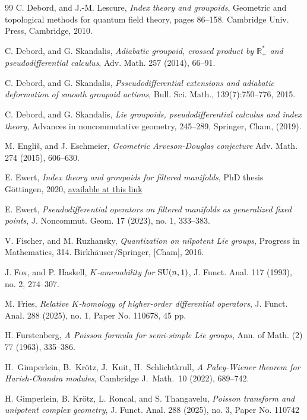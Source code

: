 \documentclass[a4paper,reqno]{amsart}
\numberwithin{equation}{section}
\theoremstyle{definition}
\theoremstyle{remark}
\begin{document}
\begin{thebibliography}{99}
 C. Debord, and J.-M. Lescure, \emph{Index theory and groupoids},  Geometric  and topological methods for quantum field theory, pages 86--158. Cambridge Univ. Press, Cambridge, 2010.

 C. Debord, and G. Skandalis, \emph{Adiabatic groupoid, crossed product by $\mathbb{R}_+^\ast$ and pseudodifferential calculus}, Adv. Math. 257 (2014), 66--91. 

 C. Debord, and G. Skandalis, \emph{Psseudodifferential extensions and adiabatic deformation of smooth groupoid actions}, Bull. Sci. Math., 139(7):750--776, 2015.

 C. Debord, and G. Skandalis, \emph{Lie groupoids, pseudodifferential calculus and index theory}, Advances in noncommutative geometry, 245--289, Springer, Cham, (2019).

 M. Engliš, and J. Eschmeier, \emph{Geometric Arveson-Douglas conjecture} Adv. Math. 274 (2015), 606--630.

 E. Ewert, \emph{Index theory and groupoids for filtered manifolds}, PhD thesis Göttingen, 2020, \href{https://ediss.uni-goettingen.de/handle/21.11130/00-1735-0000-0005-152D-2}{available at this link}

 E. Ewert, \emph{Pseudodifferential operators on filtered manifolds as generalized fixed points}, J. Noncommut. Geom. 17 (2023), no. 1, 333--383.


 V. Fischer, and M. Ruzhansky, \emph{Quantization on nilpotent Lie groups}, Progress in Mathematics, 314. Birkhäuser/Springer, [Cham], 2016. 



 J. Fox, and P. Haskell, \emph{$K$-amenability for ${\rm SU}(n,1)$}, J. Funct. Anal. 117 (1993), no. 2, 274--307.

 M. Fries, \emph{Relative $K$-homology of higher-order differential operators}, J. Funct. Anal. 288 (2025), no. 1, Paper No. 110678, 45 pp.

 H. Furstenberg, \emph{A Poisson formula for semi-simple Lie groups}, Ann. of Math. (2) 77 (1963), 335--386.

 H.~Gimperlein, B.~Kr\"{o}tz, J.~Kuit, H.~Schlichtkrull, \emph{A Paley-Wiener theorem for Harish-Chandra modules}, Cambridge J.~Math.~10 (2022), 689--742.

 H. Gimperlein, B. Krötz, L. Roncal, and S. Thangavelu, \emph{Poisson transform and unipotent complex geometry}, J. Funct. Anal. 288 (2025), no. 3, Paper No. 110742




\end{thebibliography}
\end{document}
